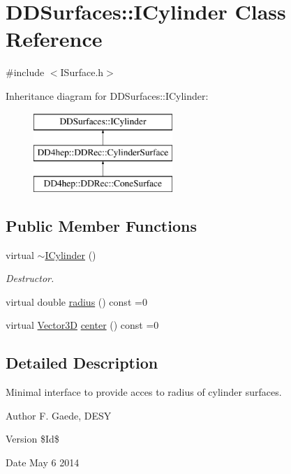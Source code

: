 \hypertarget{class_d_d_surfaces_1_1_i_cylinder}{}\section{D\+D\+Surfaces\+:\+:I\+Cylinder Class Reference}
\label{class_d_d_surfaces_1_1_i_cylinder}


{\ttfamily \#include $<$I\+Surface.\+h$>$}

Inheritance diagram for D\+D\+Surfaces\+:\+:I\+Cylinder\+:\begin{figure}[H]
\begin{center}
\leavevmode
\includegraphics[height=3.000000cm]{class_d_d_surfaces_1_1_i_cylinder}
\end{center}
\end{figure}
\subsection*{Public Member Functions}
\begin{DoxyCompactItemize}
\item 
virtual \hyperlink{class_d_d_surfaces_1_1_i_cylinder_a8b9d98560a1241956335604eb3c51c16}{$\sim$\+I\+Cylinder} ()
\begin{DoxyCompactList}\small\item\em Destructor. \end{DoxyCompactList}\item 
virtual double \hyperlink{class_d_d_surfaces_1_1_i_cylinder_a66bc9b90cdb121938eff646b2fd21385}{radius} () const =0
\item 
virtual \hyperlink{class_d_d_surfaces_1_1_vector3_d}{Vector3D} \hyperlink{class_d_d_surfaces_1_1_i_cylinder_acebccc0b84cc5b7e53bb2e56fb991f16}{center} () const =0
\end{DoxyCompactItemize}


\subsection{Detailed Description}
Minimal interface to provide acces to radius of cylinder surfaces. \begin{DoxyAuthor}{Author}
F. Gaede, D\+E\+SY 
\end{DoxyAuthor}
\begin{DoxyVersion}{Version}
\$\+Id\$ 
\end{DoxyVersion}
\begin{DoxyDate}{Date}
May 6 2014 
\end{DoxyDate}


